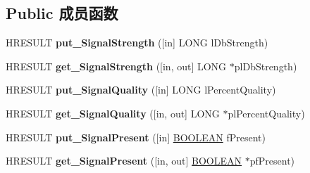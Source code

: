 \subsection*{Public 成员函数}
\begin{DoxyCompactItemize}
\item 
\mbox{\label{interface_i_b_d_a___signal_statistics_a8b66267d6f7ba14b4a8de0ddac5b8b8d}} 
H\+R\+E\+S\+U\+LT {\bfseries put\+\_\+\+Signal\+Strength} (\mbox{[}in\mbox{]} L\+O\+NG l\+Db\+Strength)
\item 
\mbox{\label{interface_i_b_d_a___signal_statistics_aa938dec7b2770b04adc1c38ab91c15ed}} 
H\+R\+E\+S\+U\+LT {\bfseries get\+\_\+\+Signal\+Strength} (\mbox{[}in, out\mbox{]} L\+O\+NG $\ast$pl\+Db\+Strength)
\item 
\mbox{\label{interface_i_b_d_a___signal_statistics_a7fa3c4fd44c2f7a12ed695a281987312}} 
H\+R\+E\+S\+U\+LT {\bfseries put\+\_\+\+Signal\+Quality} (\mbox{[}in\mbox{]} L\+O\+NG l\+Percent\+Quality)
\item 
\mbox{\label{interface_i_b_d_a___signal_statistics_a5771dfce87d409aa272858e51c424ede}} 
H\+R\+E\+S\+U\+LT {\bfseries get\+\_\+\+Signal\+Quality} (\mbox{[}in, out\mbox{]} L\+O\+NG $\ast$pl\+Percent\+Quality)
\item 
\mbox{\label{interface_i_b_d_a___signal_statistics_ab05f54dcda370fa27597c2993dd703bd}} 
H\+R\+E\+S\+U\+LT {\bfseries put\+\_\+\+Signal\+Present} (\mbox{[}in\mbox{]} \hyperlink{_processor_bind_8h_a112e3146cb38b6ee95e64d85842e380a}{B\+O\+O\+L\+E\+AN} f\+Present)
\item 
\mbox{\label{interface_i_b_d_a___signal_statistics_a06b75521f891eeb01d2ae0fe517242e6}} 
H\+R\+E\+S\+U\+LT {\bfseries get\+\_\+\+Signal\+Present} (\mbox{[}in, out\mbox{]} \hyperlink{_processor_bind_8h_a112e3146cb38b6ee95e64d85842e380a}{B\+O\+O\+L\+E\+AN} $\ast$pf\+Present)
\item 
\mbox{\label{interface_i_b_d_a___signal_statistics_a6f9d03e96f3522ff8bacdb8a5c02234e}} 

\end{DoxyCompactItemize}
